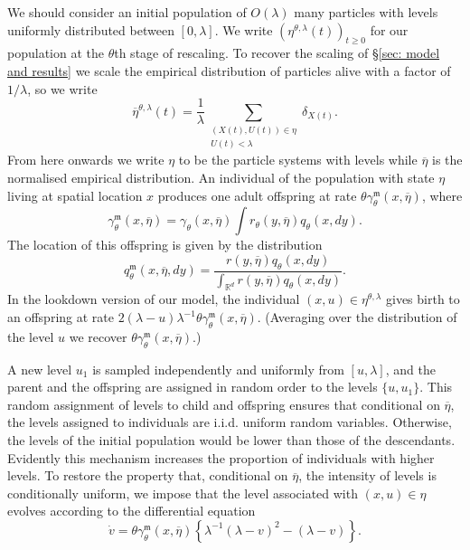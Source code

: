 \documentclass[12pt]{article}
\begin{document}
We should consider an initial population of $O(\lambda)$ many particles with levels uniformly distributed between $[0, \lambda]$. We write $(\eta^{\theta, \lambda}(t))_{t \geq 0}$ for our population at the $\theta$th stage of rescaling. To recover the scaling of \S\ref{sec: model and results} we scale the empirical distribution of particles alive with a factor of $1/\lambda$, so we write $$\overline{\eta}^{\theta, \lambda}(t)=\frac{1}{\lambda}\sum\limits_{\substack{(X(t),U(t))\in \eta \\ U(t) < \lambda}} \delta_{X(t)}.$$ 
From here onwards we write $\eta$ to be the particle systems with levels while $\overline{\eta}$ is the normalised empirical distribution. An individual of the population with state $\eta$ living at spatial location $x$ produces
one adult offspring at rate $\theta\gamma^{\mathfrak{m}}_{\theta}(x, \overline{\eta})$, where
$$\gamma^{\mathfrak{m}}_{\theta}(x,\overline{\eta})=\gamma_\theta(x,\overline{\eta})
\int r_\theta (y, \overline{\eta})q_\theta(x,dy).
$$
The location of this offspring is given by
the distribution 
\[ q^{\mathfrak{m}}_\theta(x,\overline{\eta},dy) = \frac{r(y,\overline{\eta}) q_{\theta}(x,dy)}{\int_{\mathbb{R}^d} r(y,\overline{\eta}) q_{\theta}(x,dy)}. \] In the lookdown version of our model, the individual $(x,u)\in\eta^{\theta, \lambda}$ gives
birth to an offspring at rate 
$2(\lambda-u)\lambda^{-1}\theta \gamma^{\mathfrak{m}}_{\theta}(x, \overline{\eta})$. 
(Averaging
over the distribution of the
level $u$ we recover $\theta \gamma^{\mathfrak{m}}_{\theta}(x, \overline{\eta})$.)

A new level $u_1$ is sampled independently and
uniformly from $[u,\lambda]$, and the parent and the offspring 
are assigned in random order to the  levels $\{u, u_1\}$. This random assignment of levels to child and offspring ensures that conditional on $\overline{\eta}$, the levels assigned to individuals are i.i.d. uniform random variables. Otherwise, the levels of the initial population would be lower than those of the descendants.\\
Evidently this mechanism increases the proportion of individuals with
higher levels. To restore the property that,
conditional
on $\overline{\eta}$, the intensity of
levels is conditionally uniform, we impose that 
the level associated with
$(x,u)\in\eta$ evolves
according to the differential equation
$$\dot{v}= \theta \gamma^{\mathfrak{m}}_{\theta}(x, \overline{\eta}) 
\left\{\lambda^{-1}(\lambda -v)^{2}
-(\lambda -v)\right\}.$$
\end{document}
